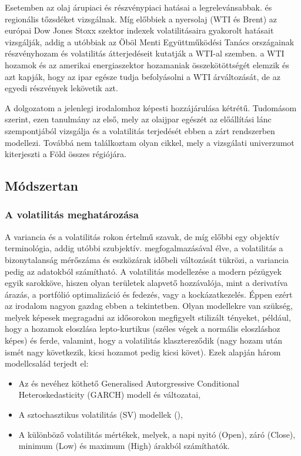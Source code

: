 \documentclass[12pt,bibliography=totoc]{article}
\begin{document}
Esetemben az olaj árupiaci és részvénypiaci hatásai a legrelevánsabbak. \cite{arouri2012impacts} és \cite{awartani2013dynamic} regionális tőzsdéket vizsgálnak. Míg előbbiek a nyersolaj (WTI és Brent) az európai Dow Jones Stoxx szektor indexek volatilitásaira gyakorolt hatásait vizsgálják, addig a utóbbiak az Öböl Menti Együttműködési Tanács országainak részvényhozam és volatilitás átterjedéseit kutatják a WTI-al szemben. \cite{ma2019spillovers} a WTI hozamok és az amerikai energiaszektor hozamaniak összekötöttségét elemzik és azt kapják, hogy az ipar egésze tudja befolyásolni a WTI árváltozását, de az egyedi részvények lekövetik azt.

A dolgozatom a jelenlegi irodalomhoz képesti hozzájárulása kétrétű. Tudomásom szerint, ezen tanulmány az első, mely az olaijpar egészét az előállítási lánc szempontjából vizsgálja és a volatilitás terjedését ebben a zárt rendszerben modellezi. Továbbá nem találkoztam olyan cikkel, mely a vizsgálati univerzumot kiterjeszti a Föld összes régiójára.


\subsection{Módszertan}
\subsubsection{A volatilitás meghatározása}



A variancia és a volatilitás rokon értelmű szavak, de míg előbbi egy objektív terminológia, addig utóbbi szubjektív. \cite{pagan1996econometrics} megfogalmazásával élve, a volatilitás a bizonytalanság mérőszáma és eszközárak időbeli változását tükrözi, a variancia pedig az adatokból számítható. A volatilitás modellezése a modern pézügyek egyik sarokköve, hiszen olyan területek alapvető hozzávalója, mint a derivatíva árazás, a portfólió optimalizáció és fedezés, vagy a kockázatkezelés. Éppen ezért az irodalom nagyon gazdag ebben a tekintetben. Olyan modellekre van szükség, melyek képesek megragadni az idősorokon megfigyelt stilizált tényeket, például, hogy a hozamok eloszlása lepto-kurtikus (széles végek a normális eloszláshoz képes) és ferde, valamint, hogy a volatilitás klasztereződik (nagy hozam után ismét nagy következik, kicsi hozamot pedig kicsi követ). Ezek alapján három modellcsalád terjedt el:

\begin{itemize}
\item Az \cite{engle1982autoregressive} és \cite{bollerslev1986generalized} nevéhez köthető Generalised Autorgressive Conditional Heteroskedasticity (GARCH) modell és változatai,
\item A sztochasztikus volatilitás (SV) modellek (\cite{hwang2000market}),
\item A különböző volatilitás mértékek, melyek, a napi nyitó (Open), záró (Close), minimum (Low) és maximum (High) árakból számíthatók.
\end{itemize}
\end{document}
